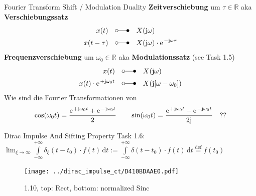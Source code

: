 \documentclass[mathserif, aspectratio=43]{intbeamer}
\newcommand\fsd{\mathrm{d}} %
\begin{document}
\begin{frame}{Fourier Transform Shift / Modulation Duality}
%
\textbf{Zeitverschiebung} um $\tau\in\mathbb{R}$ aka \textbf{Verschiebungssatz}
\begin{align*}
x(t) & \quad \laplace \quad X(\im\omega)\\
x(t - \tau) & \quad \laplace \quad X(\im\omega) \cdot \e^{-\im\omega \tau}
\end{align*}
%
\textbf{Frequenzverschiebung} um $\omega_0\in\mathbb{R}$ aka \textbf{Modulationssatz}
(see Task 1.5)
\begin{align*}
x(t) & \quad \laplace \quad X(\im\omega)\\
\label{eq:A8A2DEE53A_ModTheoremTime}
x(t) \cdot \e^{+\im\omega_0 t} & \quad \laplace \quad X(\im[\omega-\omega_0])
\end{align*}
%
Wie sind die Fourier Transformationen von
\begin{align*}
\cos(\omega_0 t) = \frac{\e^{+\im\omega_0 t}+\e^{-\im\omega_0 t}}{2}\qquad
\sin(\omega_0 t) = \frac{\e^{+\im\omega_0 t}-\e^{-\im\omega_0 t}}{2\im}\quad??
\end{align*}
\end{frame}















\begin{frame}{Dirac Impulse And Sifting Property}
Task 1.6:
%
$\lim_{\xi\to\infty} \int\limits_{-\infty}^{+\infty}
\delta_\xi(t-t_0) \cdot f(t) \, \fsd t
:= \int\limits_{-\infty}^{+\infty} \delta(t-t_0) \cdot f(t) \, \fsd t \stackrel{\mathrm{def}}= f(t_0)$
%
\begin{figure}
\texttt{[image: ../dirac\_impulse\_ct/D410BDAAE0.pdf]}
\caption{1.10, top: Rect, bottom: normalized Sinc}
\end{figure}
\end{frame}
\end{document}
